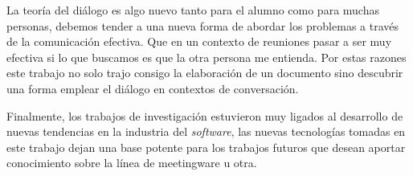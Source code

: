 La teoría del diálogo es algo nuevo tanto para el alumno como para muchas personas, debemos tender a una nueva forma de abordar los problemas a través de la comunicación  efectiva. Que en un contexto de reuniones pasar a ser muy efectiva si lo que buscamos es que la otra persona me entienda. Por estas razones este trabajo no solo trajo consigo la elaboración de un documento sino descubrir una forma emplear el diálogo en contextos de conversación.

Finalmente, los trabajos de investigación estuvieron muy ligados al desarrollo de nuevas tendencias en la industria del \textit{software}, las nuevas tecnologías tomadas en este trabajo dejan una base potente para los trabajos futuros que desean aportar conocimiento sobre la línea de meetingware u otra.




